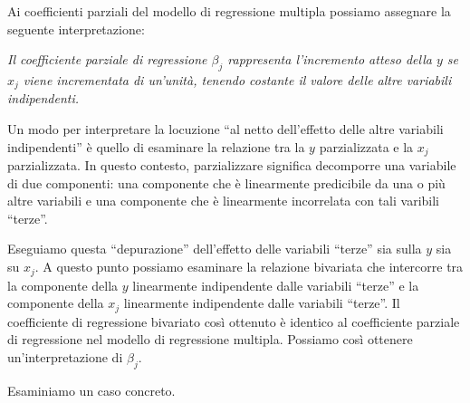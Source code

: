 \documentclass[
  11pt,
]{krantz}
\makeatletter
\newenvironment{Shaded}{\begin{snugshade}}{\end{snugshade}}
\newcommand{\CommentTok}[1]{\textcolor[rgb]{0.37,0.37,0.37}{\textit{#1}}}
\newcommand{\FunctionTok}[1]{\textcolor[rgb]{0,0,0}{#1}}
\newcommand{\NormalTok}[1]{#1}
\newcommand{\OtherTok}[1]{\textcolor[rgb]{0.37,0.37,0.37}{#1}}
\newcommand{\SpecialCharTok}[1]{\textcolor[rgb]{0,0,0}{#1}}
\newcommand{\StringTok}[1]{\textcolor[rgb]{0.5,0.5,0.5}{#1}}
\newenvironment{kframe}{%
\medskip{}
\setlength{\fboxsep}{.8em}
 \def\at@end@of@kframe{}%
 \ifinner\ifhmode%
  \def\at@end@of@kframe{\end{minipage}}%
  \begin{minipage}{\columnwidth}%
 \fi\fi%
 \def\FrameCommand##1{\hskip\@totalleftmargin \hskip-\fboxsep
 \colorbox{shadecolor}{##1}\hskip-\fboxsep
     \hskip-\linewidth \hskip-\@totalleftmargin \hskip\columnwidth}%
 \MakeFramed {\advance\hsize-\width
   \@totalleftmargin\z@ \linewidth\hsize
   \@setminipage}}%
 {\par\unskip\endMakeFramed%
 \at@end@of@kframe}
\renewenvironment{Shaded}{\begin{kframe}}{\end{kframe}}
\theoremstyle{definition}
\theoremstyle{definition}
\theoremstyle{definition}
\theoremstyle{definition}
\theoremstyle{remark}
\makeatother
\begin{document}
Ai coefficienti parziali del modello di regressione multipla possiamo assegnare la seguente interpretazione:

\emph{Il coefficiente parziale di regressione \(\beta_j\) rappresenta l'incremento atteso della \(y\) se \(x_j\) viene incrementata di un'unità, tenendo costante il valore delle altre variabili indipendenti.}

Un modo per interpretare la locuzione ``al netto dell'effetto delle altre variabili indipendenti'' è quello di esaminare la relazione tra la \(y\) parzializzata e la \(x_j\) parzializzata. In questo contesto, parzializzare significa decomporre una variabile di due componenti: una componente che è linearmente predicibile da una o più altre variabili e una componente che è linearmente incorrelata con tali varibili ``terze''.

Eseguiamo questa ``depurazione'' dell'effetto delle variabili ``terze'' sia sulla \(y\) sia su \(x_j\). A questo punto possiamo esaminare la relazione bivariata che intercorre tra la componente della \(y\) linearmente indipendente dalle variabili ``terze'' e la componente della \(x_j\) linearmente indipendente dalle variabili ``terze''. Il coefficiente di regressione bivariato così ottenuto è identico al coefficiente parziale di regressione nel modello di regressione multipla. Possiamo così ottenere un'interpretazione di \(\beta_j\).

Esaminiamo un caso concreto.

\begin{Shaded}
\end{Shaded}
\end{document}

